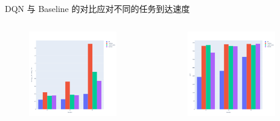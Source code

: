 \begin{frame}{DQN 与 Baseline 的对比}{应对不同的任务到达速度}

    \begin{columns}


        \begin{figure}
            \centering
            \includegraphics[width=0.9\textwidth]{pics/vary_lambda_resp.png}
        \end{figure}


        \begin{figure}
            \centering
            \includegraphics[width=0.9\textwidth]{pics/vary_lambda_cost.png}
        \end{figure}

    \end{columns}

\end{frame}

